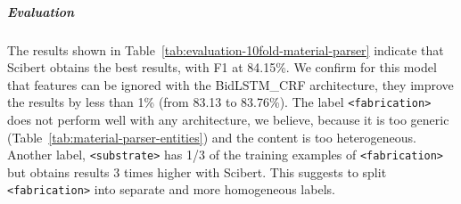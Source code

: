 \documentclass{article}
\begin{document}
\subparagraph{Evaluation}

The results shown in Table~\ref{tab:evaluation-10fold-material-parser} indicate that Scibert obtains the best results, with F1 at 84.15\%.
We confirm for this model that features can be ignored with the BidLSTM\_CRF architecture, they improve the results by less than 1\% (from 83.13 to 83.76\%). 
The label \texttt{<fabrication>} does not perform well with any architecture, we believe, because it is too generic (Table~\ref{tab:material-parser-entities}) and the content is too heterogeneous. Another label, \texttt{<substrate>} has 1/3 of the training examples of \texttt{<fabrication>} but obtains results 3 times higher with Scibert. 
This suggests to split \texttt{<fabrication>} into separate and more homogeneous labels. 

\begin{table}[ht]
\centering\small
{}
\end{table}
\end{document}
